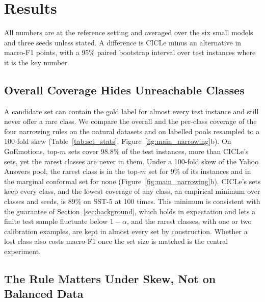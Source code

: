 \section{Results}
\label{sec:results}

All numbers are at the reference setting and averaged over the six small models and three seeds unless stated.
A difference is CICLe minus an alternative in macro-F1 points, with a 95\% paired bootstrap interval over test instances where it is the key number. %

\subsection{Overall Coverage Hides Unreachable Classes}
\label{sec:res-coverage}

A candidate set can contain the gold label for almost every test instance and still never offer a rare class.
We compare the overall and the per-class coverage of the four narrowing rules on the natural datasets and on labelled pools resampled to a 100-fold skew (Table~\ref{tab:set_stats}, Figure~\ref{fig:main_narrowing}b).
On GoEmotions, top-$m$ sets cover 98.8\% of the test instances, more than CICLe's sets, yet the rarest classes are never in them.
Under a 100-fold skew of the Yahoo Answers pool, the rarest class is in the top-$m$ set for 9\% of its instances and in the marginal conformal set for none (Figure~\ref{fig:main_narrowing}b).
CICLe's sets keep every class, and the lowest coverage of any class, an empirical minimum over classes and seeds, is 89\% on SST-5 at 100 times. %
This minimum is consistent with the guarantee of Section~\ref{sec:background}, which holds in expectation and lets a finite test sample fluctuate below $1-\alpha$, and the rarest classes, with one or two calibration examples, are kept in almost every set by construction.
Whether a lost class also costs macro-F1 once the set size is matched is the central experiment.



\subsection{The Rule Matters Under Skew, Not on Balanced Data}
\label{sec:res-narrowing}

